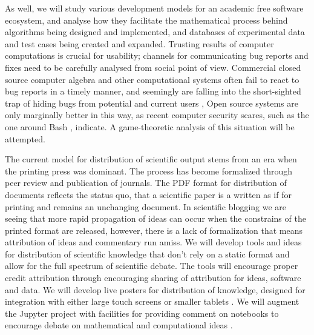 \begin{workpackage}[id=social-aspects,wphases=0-48,
  title=Social Aspects,
  lead=UO,
  UORM=27,USHRM=8, USORM=6]
\begin{wpdescription}
As well, we will study various development models for an academic free
software ecosystem, and analyse how they facilitate the mathematical
process behind algorithms being designed and implemented, and
databases of experimental data and test cases being created and
expanded.  Trusting results of computer computations is crucial for
usability; channels for communicating bug reports and fixes need to be
carefully analysed from social point of view.  Commercial closed
source computer algebra and other computational systems often fail to
react to bug reports in a timely manner, and seemingly are falling
into the short-sighted trap of hiding bugs from potential and current
users \cite{misfort}, Open source systems are only marginally better
in this way, as recent computer security scares, such as the one
around Bash \cite{shellshock}, indicate.  A game-theoretic analysis of
this situation will be attempted.
\end{wpdescription}

\begin{tasklist}
\begin{task}[title=Modern Distribution of Scientific Output]
   The current model
  for distribution of scientific output stems from an era when the
  printing press was dominant. The process has become formalized
  through peer review and publication of journals. The PDF format for
  distribution of documents reflects the status quo, that a scientific
  paper is a written as if for printing and remains an unchanging
  document. In scientific blogging we are seeing that more rapid
  propagation of ideas can occur when the constrains of the printed
  format are released, however, there is a lack of formalization that
  means attribution of ideas and commentary run amiss. We will develop
  tools and ideas for distribution of scientific knowledge that don't
  rely on a static format and allow for the full spectrum of
  scientific debate. The tools will encourage proper credit
  attribution through encouraging sharing of attribution for ideas,
  software and data. We will develop live posters for distribution of
  knowledge, designed for integration with either large touch screens
  or smaller tablets . We will augment
  the Jupyter project with facilities for providing comment on
  notebooks to encourage debate on mathematical and computational
  ideas .
\end{task}


\end{tasklist}
\end{workpackage}
